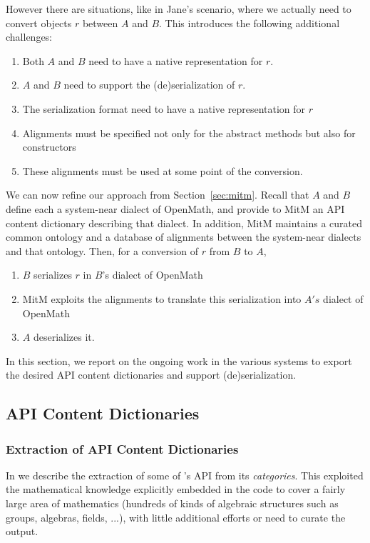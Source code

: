 However there are situations, like in Jane's scenario, where we
actually need to convert objects $r$ between $A$ and $B$. This
introduces the following additional challenges:
\begin{enumerate}
\item Both $A$ and $B$ need to have a native representation for $r$.
\item $A$ and $B$ need to support the (de)serialization of $r$.
\item The serialization format need to have a native representation
  for $r$
\item Alignments must be specified not only for the abstract methods
  but also for constructors
\item These alignments must be used at some point of the conversion.
\end{enumerate}

We can now refine our approach from Section~\ref{sec:mitm}. Recall
that $A$ and $B$ define each a system-near dialect of OpenMath, and
provide to MitM an API content dictionary describing that dialect. In
addition, MitM maintains a curated common ontology and a database of
alignments between the system-near dialects and that ontology. Then,
for a conversion of $r$ from $B$ to $A$,
\begin{enumerate}
\item $B$ serializes $r$ in $B$'s dialect of OpenMath
\item MitM exploits the alignments to translate this serialization
  into $A's$ dialect of OpenMath
\item $A$ deserializes it.
\end{enumerate}

In this section, we report on the ongoing work in the various systems
to export the desired API content dictionaries and support
(de)serialization.

\subsection{\Sage API Content Dictionaries}

\subsubsection{Extraction of \Sage API Content Dictionaries}

In \cite{DehKohKon:iop16} we describe the extraction of some of \Sage's
API from its \emph{categories}. This exploited the mathematical
knowledge explicitly embedded in the code to cover a fairly large area
of mathematics (hundreds of kinds of algebraic structures such as
groups, algebras, fields, ...), with little additional efforts or need
to curate the output.

